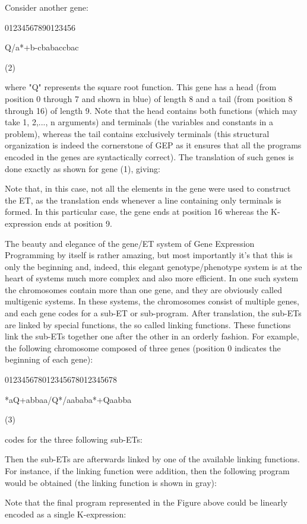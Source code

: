 \documentclass[titlepage,a4paper,12pt]{book}
\begin{document}
Consider another gene:

01234567890123456 	 

Q/a*+b-cbabaccbac
	

(2)

where "Q" represents the square root function. This gene has a head (from position 0 through 7 and shown in blue) of length 8 and a tail (from position 8 through 16) of length 9. Note that the head contains both functions (which may take 1, 2,..., n arguments) and terminals (the variables and constants in a problem), whereas the tail contains exclusively terminals (this structural organization is indeed the cornerstone of GEP as it ensures that all the programs encoded in the genes are syntactically correct). The translation of such genes is done exactly as shown for gene (1), giving:

Note that, in this case, not all the elements in the gene were used to construct the ET, as the translation ends whenever a line containing only terminals is formed. In this particular case, the gene ends at position 16 whereas the K-expression ends at position 9.

The beauty and elegance of the gene/ET system of Gene Expression Programming by itself is rather amazing, but most importantly it's that this is only the beginning and, indeed, this elegant genotype/phenotype system is at the heart of systems much more complex and also more efficient. In one such system the chromosomes contain more than one gene, and they are obviously called multigenic systems. In these systems, the chromosomes consist of multiple genes, and each gene codes for a sub-ET or sub-program. After translation, the sub-ETs are linked by special functions, the so called linking functions. These functions link the sub-ETs together one after the other in an orderly fashion. For example, the following chromosome composed of three genes (position 0 indicates the beginning of each gene):

012345678012345678012345678 	 

*aQ+abbaa/Q*/aababa*+Qaabba
	

(3)

codes for the three following sub-ETs:

Then the sub-ETs are afterwards linked by one of the available linking functions. For instance, if the linking function were addition, then the following program would be obtained (the linking function is shown in gray):

Note that the final program represented in the Figure above could be linearly encoded as a single K-expression:
\end{document}
